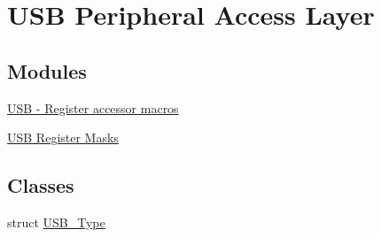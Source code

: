 \hypertarget{group__USB__Peripheral__Access__Layer}{}\section{U\+SB Peripheral Access Layer}
\label{group__USB__Peripheral__Access__Layer}
\subsection*{Modules}
\begin{DoxyCompactItemize}
\item 
\hyperlink{group__USB__Register__Accessor__Macros}{U\+S\+B -\/ Register accessor macros}
\item 
\hyperlink{group__USB__Register__Masks}{U\+S\+B Register Masks}
\end{DoxyCompactItemize}
\subsection*{Classes}
\begin{DoxyCompactItemize}
\item 
struct \hyperlink{structUSB__Type}{U\+S\+B\+\_\+\+Type}
\end{DoxyCompactItemize}
